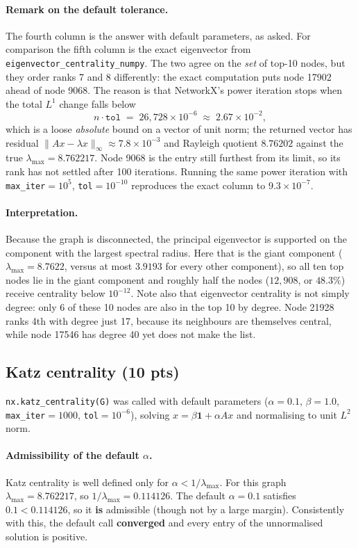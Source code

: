 \paragraph{Remark on the default tolerance.}
The fourth column is the answer with default parameters, as asked. For comparison
the fifth column is the exact eigenvector from
\texttt{eigenvector\_\-centrality\_\-numpy}. The two agree on the \emph{set} of
top-10 nodes, but they order ranks 7 and 8 differently: the exact computation puts
node 17902 ahead of node 9068. The reason is that NetworkX's power iteration stops
when the total $L^1$ change falls below
\[
  n\cdot\texttt{tol} \;=\; 26{,}728\times10^{-6} \;\approx\; 2.67\times10^{-2},
\]
which is a loose \emph{absolute} bound on a vector of unit norm; the returned
vector has residual $\lVert Ax-\lambda x\rVert_\infty\approx7.8\times10^{-3}$ and
Rayleigh quotient $8.76202$ against the true
$\lambda_{\max}=8.762217$. Node 9068 is the entry still
furthest from its limit, so its rank has not settled after 100 iterations. Running
the same power iteration with \texttt{max\_iter}$=10^5$, \texttt{tol}$=10^{-10}$
reproduces the exact column to $9.3\times10^{-7}$.

\paragraph{Interpretation.}
Because the graph is disconnected, the principal eigenvector is supported on the
component with the largest spectral radius. Here that is the giant component
($\lambda_{\max}=8.7622$, versus at most $3.9193$ for every other component), so all
ten top nodes lie in the giant component and roughly half the nodes
($12{,}908$, or $48.3\%$) receive centrality below $10^{-12}$. Note also that
eigenvector centrality is not simply degree: only 6 of these 10 nodes are also in
the top 10 by degree. Node 21928 ranks 4th with degree just 17, because its
neighbours are themselves central, while node 17546 has degree 40 yet does not
make the list.

\subsection{Katz centrality (10 pts)}

\texttt{nx.katz\_centrality(G)} was called with default parameters
($\alpha=0.1$, $\beta=1.0$, \texttt{max\_iter}$=1000$, \texttt{tol}$=10^{-6}$),
solving $x=\beta\mathbf{1}+\alpha Ax$ and normalising to unit $L^2$ norm.

\paragraph{Admissibility of the default $\alpha$.}
Katz centrality is well defined only for $\alpha<1/\lambda_{\max}$. For this graph
$\lambda_{\max}=8.762217$, so $1/\lambda_{\max}=0.114126$. The default
$\alpha=0.1$ satisfies $0.1<0.114126$, so it \textbf{is} admissible (though not by
a large margin). Consistently with this, the default call \textbf{converged} and
every entry of the unnormalised solution is positive.

